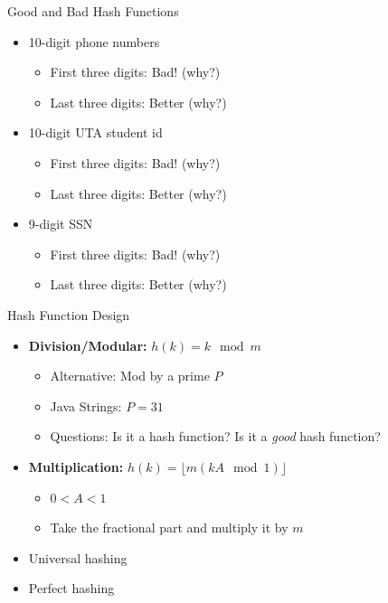 \documentclass{beamer}
\begin{document}
\begin{frame}{Good and Bad Hash Functions}
    \begin{itemize}
        \item 10-digit phone numbers
        \begin{itemize}
            \item First three digits: Bad! (why?)
            \item Last three digits: Better (why?)
        \end{itemize} 
        \item 10-digit UTA student id 
        \begin{itemize}
            \item First three digits: Bad! (why?)
            \item Last three digits: Better (why?)
        \end{itemize} 
        \item 9-digit SSN
        \begin{itemize}
            \item First three digits: Bad! (why?)
            \item Last three digits: Better (why?)
        \end{itemize} 
    \end{itemize}
\end{frame}

\begin{frame}{Hash Function Design}
    \begin{itemize}
        \item {\bf Division/Modular:} $h(k) = k \mod m$  
        \begin{itemize}
            \item Alternative: Mod by a prime $P$
            \item Java Strings: $P=31$
            \item Questions: Is it a hash function? Is it a {\em good} hash function?
        \end{itemize} 
        \item {\bf Multiplication:} $h(k) = \lfloor m(kA \mod 1) \rfloor$  
        \begin{itemize}
            \item $0 < A < 1$
            \item Take the fractional part and multiply it by $m$
        \end{itemize} 
        \item Universal hashing
        \item Perfect hashing
    \end{itemize}
\end{frame}
\end{document}
